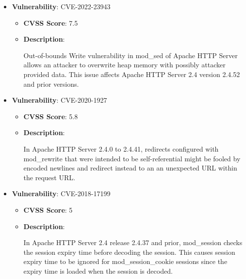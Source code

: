 \documentclass{article}
\begin{document}
\begin{itemize}
        \item \textbf{Vulnerability}: CVE-2022-23943
        \begin{itemize}
            \item \textbf{CVSS Score}:  7.5 
            \item \textbf{Description}:
            \parbox[t]{0.9\linewidth}{
                \ttfamily Out-of-bounds Write vulnerability in mod\_sed of Apache HTTP Server allows an attacker to overwrite heap memory with possibly attacker provided data. This issue affects Apache HTTP Server 2.4 version 2.4.52 and prior versions.
            }
        \end{itemize}
    
        \item \textbf{Vulnerability}: CVE-2020-1927
        \begin{itemize}
            \item \textbf{CVSS Score}:  5.8 
            \item \textbf{Description}:
            \parbox[t]{0.9\linewidth}{
                \ttfamily In Apache HTTP Server 2.4.0 to 2.4.41, redirects configured with mod\_rewrite that were intended to be self-referential might be fooled by encoded newlines and redirect instead to an an unexpected URL within the request URL.
            }
        \end{itemize}
    
        \item \textbf{Vulnerability}: CVE-2018-17199
        \begin{itemize}
            \item \textbf{CVSS Score}:  5 
            \item \textbf{Description}:
            \parbox[t]{0.9\linewidth}{
                \ttfamily In Apache HTTP Server 2.4 release 2.4.37 and prior, mod\_session checks the session expiry time before decoding the session. This causes session expiry time to be ignored for mod\_session\_cookie sessions since the expiry time is loaded when the session is decoded.
            }
        \end{itemize}
    

\end{itemize}
\end{document}
